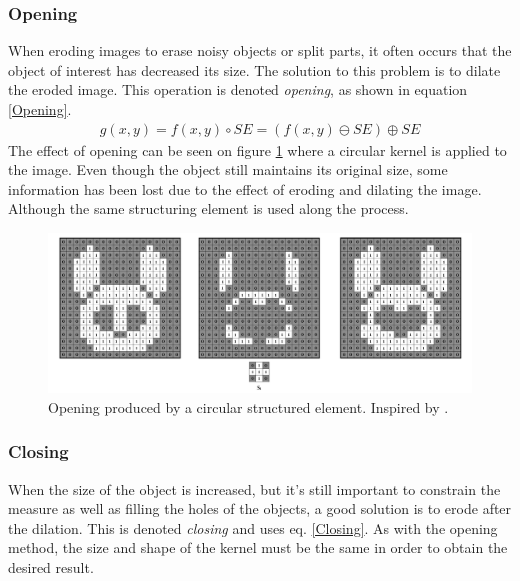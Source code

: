 \subsubsection{Opening}
When eroding images to erase noisy objects or split parts, it often occurs that the object of interest has decreased its size. The solution to this problem is to dilate the eroded image. This operation is denoted \textit{opening}, as shown in equation \ref{Opening}.
\begin{equation}
\begin{aligned}
{g(x,y)}={f(x,y)}\circ{SE}=({f(x,y)}\ominus{SE})\oplus{SE}
\label{Opening}
	\end{aligned}
\end{equation}
The effect of opening can be seen on figure \ref{fig:Opening} where a circular kernel is applied to the image. Even though the object still maintains its original size, some information has been lost due to the effect of eroding and dilating the image. Although the same structuring element is used along the process.

\begin{figure}[htbp]
\centering
\includegraphics[width=1\textwidth]{Pictures/Theory/OpeningCirc.png}
\caption{Opening produced by a circular structured element. Inspired by \citep{ip_book}.}
\label{fig:Opening}
\end{figure}

\subsubsection{Closing}\label{closing}
When the size of the object is increased, but it's still important to constrain the measure as well as filling the holes of the objects, a good solution is to erode after the dilation. This is denoted \textit{closing} and uses eq. \ref{Closing}. As with the opening method, the size and shape of the kernel must be the same in order to obtain the desired result.

